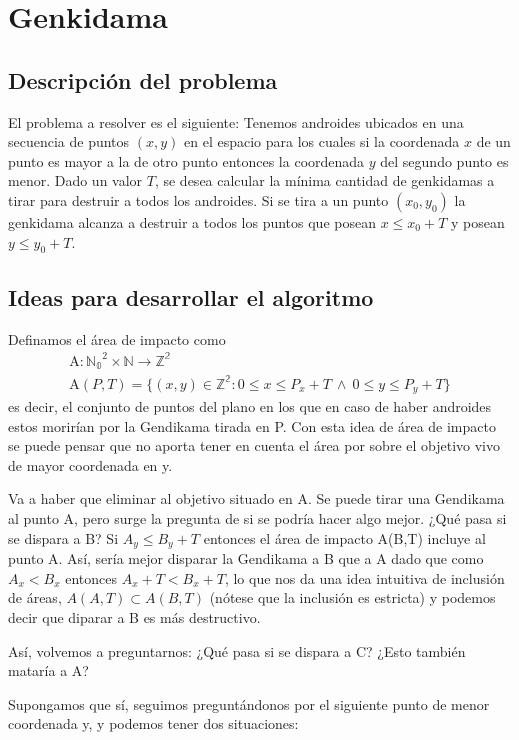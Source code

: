 \documentclass[10pt,a4paper]{article}
\begin{document}

\section{Genkidama}

\subsection{Descripción del problema}

El problema a resolver es el siguiente:
Tenemos androides ubicados en una secuencia de puntos $(x,y)$ en el espacio para los cuales si la coordenada $x$ de un punto es mayor a la de otro punto entonces la coordenada $y$ del segundo punto es menor. Dado un valor $T$, se desea calcular la mínima cantidad de genkidamas a tirar para destruir a todos los androides. Si se tira a un punto $(x_{0},y_{0})$ la genkidama alcanza a destruir a todos los puntos que posean $x \leq x_{0} + T$ y posean $y \leq y_{0} + T$.

\subsection{Ideas para desarrollar el algoritmo}

Definamos el área de impacto como
\begin{gather*}
\textrm{A}:\mathbb{N_{0}}^2 \times \mathbb{N} \rightarrow \mathbb{Z^2}\\
 \textrm{A}(P,T) = \{ (x, y) \in \mathbb{Z^2} : 0 \leq x \leq P_{x}+T ~ \wedge ~ 0 \leq y \leq P_{y}+T \}
\end{gather*}
 es decir, el conjunto de puntos del plano en los que en caso de haber androides estos morirían por la Gendikama tirada en P. Con esta idea de área de impacto se puede pensar que no aporta tener en cuenta el área por sobre el objetivo vivo de mayor coordenada en y.
\par{Va a haber que eliminar al objetivo situado en A. Se puede tirar una Gendikama al punto A, pero surge la pregunta de si se podría hacer algo mejor. ¿Qué pasa si se dispara a B? Si $ A_{y} \leq B_{y}+T$ entonces el área de impacto A(B,T) incluye al punto A. Así, sería mejor disparar la Gendikama a B que a A dado que como  $A_{x} < B_{x}$ entonces  $A_{x}+T < B_{x}+T$, lo que nos da una idea intuitiva de inclusión de áreas, $A(A,T) \subset A(B,T)$ (nótese que la inclusión es estricta) y podemos decir que diparar a B es más destructivo.}
\par{Así, volvemos a preguntarnos: ¿Qué pasa si se dispara a C? ¿Esto también mataría a A?}
\par{Supongamos que sí, seguimos preguntándonos por el siguiente punto de menor coordenada y, y podemos tener dos situaciones:}
\end{document}
